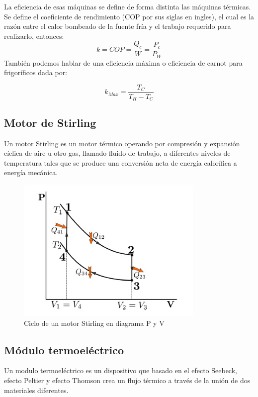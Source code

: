 La eficiencia de esas máquinas se define de forma distinta las máquinas térmicas. Se deﬁne el coeficiente de rendimiento (COP por sus siglas en ingles), el cual es la razón entre el calor bombeado de la fuente fría y el trabajo requerido para realizarlo, entonces:
\begin{equation}
    k=COP=\frac{Q_c}{W}=\frac{P_c}{P_W}
\end{equation}
También podemos hablar de una eficiencia máxima o eficiencia de carnot para frigoríficos dada por:

\begin{equation}
    k_{Max}=\frac{T_C}{T_H-T_C}
\end{equation}

\subsection{Motor de Stirling}
Un motor Stirling es un motor térmico operando por compresión y expansión cíclica de aire u otro gas, llamado ﬂuido de trabajo, a diferentes niveles de temperatura tales que se produce una conversión neta de energía caloríﬁca a energía mecánica.
\begin{figure}[H]
    \centering
    \includegraphics[scale=0.6]{img/stirling.png}
    \caption{Ciclo de un motor Stirling en diagrama P y V}
    \label{fig:my_label}
\end{figure}

\subsection{Módulo termoeléctrico}
Un modulo termoeléctrico es un dispositivo que basado en el efecto Seebeck, efecto Peltier y efecto Thomson crea un ﬂujo térmico a través de la unión de dos materiales diferentes.

